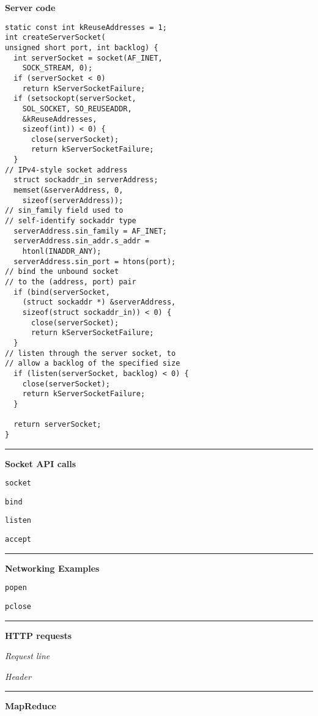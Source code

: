 \documentclass{article}
\begin{document}
\begin{multicols}{3}
  {\bf Server code}
  \begin{verbatim}
static const int kReuseAddresses = 1;
int createServerSocket(
unsigned short port, int backlog) {
  int serverSocket = socket(AF_INET,
    SOCK_STREAM, 0);
  if (serverSocket < 0)
    return kServerSocketFailure;
  if (setsockopt(serverSocket,
    SOL_SOCKET, SO_REUSEADDR,
    &kReuseAddresses,
    sizeof(int)) < 0) {
      close(serverSocket);
      return kServerSocketFailure;
  }
// IPv4-style socket address
  struct sockaddr_in serverAddress;
  memset(&serverAddress, 0,
    sizeof(serverAddress));
// sin_family field used to
// self-identify sockaddr type
  serverAddress.sin_family = AF_INET;
  serverAddress.sin_addr.s_addr =
    htonl(INADDR_ANY);
  serverAddress.sin_port = htons(port);
// bind the unbound socket
// to the (address, port) pair
  if (bind(serverSocket,
    (struct sockaddr *) &serverAddress,
    sizeof(struct sockaddr_in)) < 0) {
      close(serverSocket);
      return kServerSocketFailure;
  }
// listen through the server socket, to
// allow a backlog of the specified size
  if (listen(serverSocket, backlog) < 0) {
    close(serverSocket);
    return kServerSocketFailure;
  }

  return serverSocket;
}
  \end{verbatim}

  \noindent\rule{4cm}{0.4pt}

  {\bf Socket API calls}

  {\tt socket}

  {\tt bind}

  {\tt listen}

  {\tt accept}

  \noindent\rule{4cm}{0.4pt}

  {\bf Networking Examples}

  {\tt popen}

  {\tt pclose}

  \noindent\rule{4cm}{0.4pt}

  {\bf HTTP requests}

  {\it Request line}

  {\it Header}

  \noindent\rule{4cm}{0.4pt}

  {\bf MapReduce}

\end{multicols}
\end{document}
